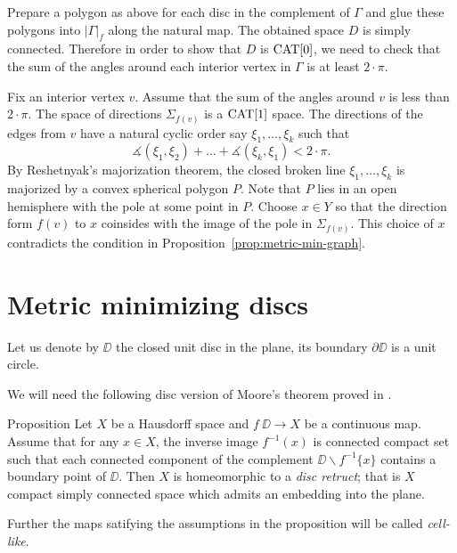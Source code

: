 \documentclass[a4paper,10pt]{amsart}
\begin{document}
Prepare a polygon as above for each disc in the complement of $\Gamma$
and glue these polygons into $|\Gamma|_f$ along the natural map.
The obtained space $D$ is simply connected.
Therefore in order to show that $D$ is $\mathop{\rm CAT}\nolimits[0]$,
we need to check that the sum of the angles around each interior vertex in $\Gamma$ is at least $2\cdot\pi$.

Fix an interior vertex $v$.
Assume that the sum of the angles around $v$ is less than $2\cdot\pi$.
The space of directions $\Sigma_{f(v)}$ is a $\mathop{\rm CAT}\nolimits[1]$ space.
The directions of the edges from $v$ have a natural
cyclic order say $\xi_1,\dots,\xi_k$
such that
\[\measuredangle(\xi_1,\xi_2)+\dots+\measuredangle(\xi_k,\xi_1)<2\cdot\pi.\]
By Reshetnyak's majorization theorem,
the closed broken line $\xi_1,\dots,\xi_k$ is majorized by a convex spherical polygon $P$.
Note that $P$ lies in an open hemisphere with the pole  at some point in $P$.
Choose $x\in Y$ so that the direction form $f(v)$ to $x$ coinsides with the image of the pole in $\Sigma_{f(v)}$.
This choice of $x$ contradicts the condition in Proposition~\ref{prop:metric-min-graph}.\qeds







\section{Metric minimizing discs}



Let us denote by $\DD$ the closed unit disc in the plane,
its boundary $\partial \DD$ is a unit circle.

We will need the following disc version of Moore's theorem proved in \cite{moore}.

\begin{thm}{Proposition}\label{prop:disc-moore}
Let $X$ be a Hausdorff space and
$f\:\DD\to X$ be a continuous map.
Assume that for any $x\in X$, 
the inverse image
$f^{-1}(x)$ is connected compact set such that 
each connected  component 
of the complement $\DD\backslash f^{-1}\{x\}$ 
contains a boundary point of $\DD$.
Then $X$ is homeomorphic to a \emph{disc retruct};
that is $X$ compact simply connected space which admits an embedding into the plane.
\end{thm}

Further the maps satifying the assumptions in the proposition will be called \emph{cell-like}.%
\end{document}

